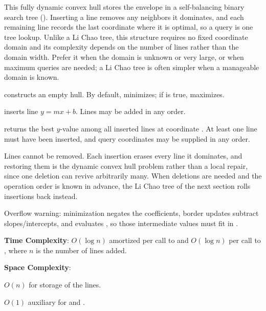 This fully dynamic convex hull stores the envelope in a self-balancing binary search tree (). Inserting a line removes any neighbors it dominates, and each remaining line records the last coordinate where it is optimal, so a query is one tree lookup. Unlike a Li Chao tree, this structure requires no fixed coordinate domain and its complexity depends on the number of lines rather than the domain width. Prefer it when the domain is unknown or very large, or when maximum queries are needed; a Li Chao tree is often simpler when a manageable domain is known.

\begin{compactitem}
  \item {} constructs an empty hull. By default,  minimizes; if  is true,  maximizes.
  \item {} inserts line $y = mx + b$. Lines may be added in any order.
  \item {} returns the best $y$-value among all inserted lines at coordinate . At least one line must have been inserted, and query coordinates may be supplied in any order.
\end{compactitem}

Lines cannot be removed. Each insertion erases every line it dominates, and restoring them is the dynamic convex hull problem rather than a local repair, since one deletion can revive arbitrarily many. When deletions are needed and the operation order is known in advance, the Li Chao tree of the next section rolls insertions back instead.

Overflow warning: minimization negates the coefficients, border updates subtract slopes/intercepts, and  evaluates , so those intermediate values must fit in .

\textbf{Time Complexity}: $O(\log n)$ amortized per call to  and $O(\log n)$ per call to , where $n$ is the number of lines added.

\textbf{Space Complexity}:
\begin{compactitem}
  \item $O(n)$ for storage of the lines.
  \item $O(1)$ auxiliary for  and .
\end{compactitem}

